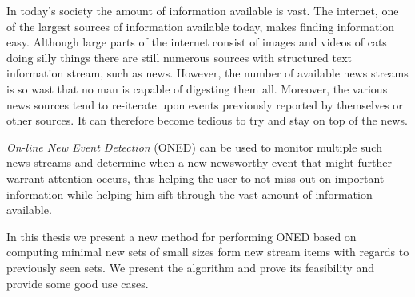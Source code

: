 In today's society the amount of information available is vast. The internet, one of the largest sources of information available today, makes finding information easy. Although large parts of the internet consist of images and videos of cats doing silly things there are still numerous sources with structured text information stream, such as news. However, the number of available news streams is so wast that no man is capable of digesting them all. Moreover, the various news sources tend to re-iterate upon events previously reported by themselves or other sources. It can therefore become tedious to try and stay on top of the news. 

\emph{On-line New Event Detection} (ONED) can be used to monitor multiple such news streams and determine when a new newsworthy event that might further warrant attention occurs, thus helping the user to not miss out on important information while helping him sift through the vast amount of information available.

In this thesis we present a new method for performing ONED based on computing minimal new sets of small sizes form new stream items with regards to previously seen sets. We present the algorithm and prove its feasibility and provide some good use cases.
